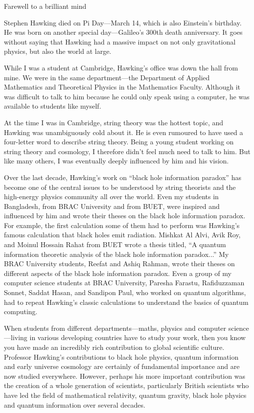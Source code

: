 \documentclass[a4paper,11pt]{article}
\begin{document}
\begin{center}
\begin{LARGE}
Farewell to a brilliant mind
\end{LARGE}
\end{center}

Stephen Hawking died on Pi Day—March 14, which is also Einstein's birthday. He was born on another special day—Galileo's 300th death anniversary. It goes without saying that Hawking had a massive impact on not only gravitational physics, but also the world at large.

While I was a student at Cambridge, Hawking's office was down the hall from mine. We were in the same department—the Department of Applied Mathematics and Theoretical Physics in the Mathematics Faculty. Although it was difficult to talk to him because he could only speak using a computer, he was available to students like myself.

At the time I was in Cambridge, string theory was the hottest topic, and Hawking was unambiguously cold about it. He is even rumoured to have used a four-letter word to describe string theory. Being a young student working on string theory and cosmology, I therefore didn't feel much need to talk to him. But like many others, I was eventually deeply influenced by him and his vision. 

Over the last decade, Hawking's work on “black hole information paradox” has become one of the central issues to be understood by string theorists and the high-energy physics community all over the world. Even my students in Bangladesh, from BRAC University and from BUET, were inspired and influenced by him and wrote their theses on the black hole information paradox. For example, the first calculation some of them had to perform was Hawking's famous calculation that black holes emit radiation. Mishkat Al Alvi, Avik Roy, and Moinul Hossain Rahat from BUET wrote a thesis titled, “A quantum information theoretic analysis of the black hole information paradox...” My BRAC University students, Reefat and Ashiq Rahman, wrote their theses on different aspects of the black hole information paradox. Even a group of my computer science students at BRAC University, Paresha Farastu, Rafiduzzaman Sonnet, Saddat Hasan, and Sandipon Paul, who worked on quantum algorithms, had to repeat Hawking's classic calculations to understand the basics of quantum computing.

When students from different departments—maths, physics and computer science—living in various developing countries have to study your work, then you know you have made an incredibly rich contribution to global scientific culture. Professor Hawking's contributions to black hole physics, quantum information and early universe cosmology are certainly of fundamental importance and are now studied everywhere. However, perhaps his more important contribution was the creation of a whole generation of scientists, particularly British scientists who have led the field of mathematical relativity, quantum gravity, black hole physics and quantum information over several decades.
\end{document}
